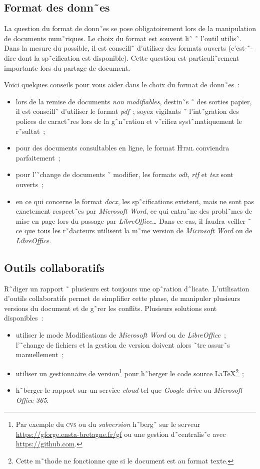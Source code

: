\subsection{Format des donn˜es}

La question du format de donn˜es se pose obligatoirement lors de la
manipulation de documents num˜riques. Le choix du format est souvent li˜ ˜
l'outil utilis˜. Dans la mesure du possible, il est conseill˜ d'utiliser des
formats ouverts (c'est-˜-dire dont la sp˜cification est disponible).
Cette question est particuli˜rement importante lors du partage de document.

Voici quelques conseils pour vous aider dans le choix du format de donn˜es~:
\begin{itemize}
\item lors de la remise de documents \emph{non modifiables}, destin˜s ˜ des
  sorties papier, il est conseill˜ d'utiliser le format \emph{pdf}~; soyez
  vigilants ˜ l'int˜gration des polices de caract˜res lors de la g˜n˜ration et
  v˜rifiez syst˜matiquement le r˜sultat~; 
\item pour des documents consultables en ligne, le format \textsc{Html}
  conviendra parfaitement~;
\item pour l'˜change de documents ˜ modifier, les formats \emph{odt},
  \emph{rtf} et \emph{tex} sont ouverts~;
\item en ce qui concerne le format \emph{docx}, les sp˜cifications existent,
  mais ne sont pas exactement respect˜es par \emph{Microsoft Word}, ce qui
  entra˜ne des probl˜mes de mise en page lors du passage par
  \emph{LibreOffice}\ldots{} Dans ce cas, il faudra veiller ˜ ce que tous les
  r˜dacteurs utilisent la m˜me version de \emph{Microsoft Word} ou de
  \emph{LibreOffice}. 
\end{itemize}

\subsection{Outils collaboratifs}

R˜diger un rapport ˜ plusieurs est toujours une op˜ration
d˜licate. L'utilisation d'outils collaboratifs permet de simplifier cette
phase, de manipuler plusieurs versions du document et de g˜rer les conflits.
Plusieurs solutions sont disponibles~:
\begin{itemize}
\item utiliser le mode \og{}Modifications\fg{} de \emph{Microsoft Word} ou de
  \emph{LibreOffice}~; l'˜change de fichiers et la gestion de version doivent
  alors ˜tre assur˜s manuellement~;
\item utiliser un gestionnaire de version\footnote{Par exemple du \textsc{cvs}
  ou du \emph{subversion} h˜berg˜ sur le serveur
  \url{https://gforge.ensta-bretagne.fr/gf} ou une gestion d˜centralis˜e avec
  \url{https://github.com}.} pour h˜berger le code source
\LaTeX\footnote{Cette m˜thode ne fonctionne que si le document est au format
  texte.}~;
\item h˜berger le rapport sur un service \emph{cloud} tel que
  \emph{Google drive} ou \emph{Microsoft Office 365}.
\end{itemize}

